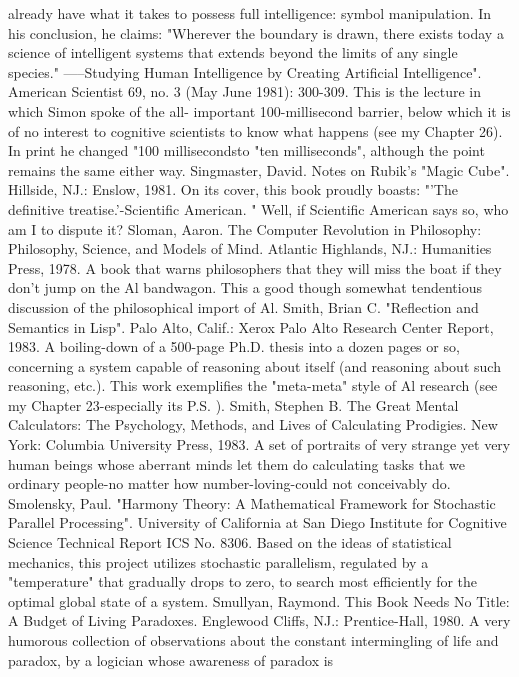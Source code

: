   already have what it takes to possess full intelligence: symbol manipulation. In his
  conclusion, he claims: "Wherever the boundary is drawn, there exists today a science of
  intelligent systems that extends beyond the limits of any single species."
-----Studying Human Intelligence by Creating Artificial Intelligence". American Scientist 69,
  no. 3 (May June 1981): 300-309. This is the lecture in which Simon spoke of the all-
  important 100-millisecond barrier, below which it is of no interest to cognitive scientists to
  know what happens (see my Chapter 26). In print he changed "100 millisecondsto "ten
  milliseconds", although the point remains the same either way.
Singmaster, David. Notes on Rubik's "Magic Cube". Hillside, NJ.: Enslow, 1981. On its
  cover, this book proudly boasts: "'The definitive treatise.'-Scientific American. " Well, if
  Scientific American says so, who am I to dispute it?
Sloman, Aaron. The Computer Revolution in Philosophy: Philosophy, Science, and Models of
  Mind. Atlantic Highlands, NJ.: Humanities Press, 1978. A book that warns philosophers
  that they will miss the boat if they don't jump on the Al bandwagon. This a good though
  somewhat tendentious discussion of the philosophical import of Al.
Smith, Brian C. "Reflection and Semantics in Lisp". Palo Alto, Calif.: Xerox Palo Alto
  Research Center Report, 1983. A boiling-down of a 500-page Ph.D. thesis into a dozen
  pages or so, concerning a system capable of reasoning about itself (and reasoning about
  such reasoning, etc.). This work exemplifies the "meta-meta" style of Al research (see my
  Chapter 23-especially its P.S. ).
Smith, Stephen B. The Great Mental Calculators: The Psychology, Methods, and Lives of
  Calculating Prodigies. New York: Columbia University Press, 1983. A set of portraits of
  very strange yet very human beings whose aberrant minds let them do calculating tasks that
  we ordinary people-no matter how number-loving-could not conceivably do.
Smolensky, Paul. "Harmony Theory: A Mathematical Framework for Stochastic Parallel
  Processing". University of California at San Diego Institute for Cognitive Science Technical
  Report ICS No. 8306. Based on the ideas of statistical mechanics, this project utilizes
  stochastic parallelism, regulated by a "temperature" that gradually drops to zero, to search
  most efficiently for the optimal global state of a system.
Smullyan, Raymond. This Book Needs No Title: A Budget of Living Paradoxes. Englewood
  Cliffs, NJ.: Prentice-Hall, 1980. A very humorous collection of observations about the
  constant intermingling of life and paradox, by a logician whose awareness of paradox is
